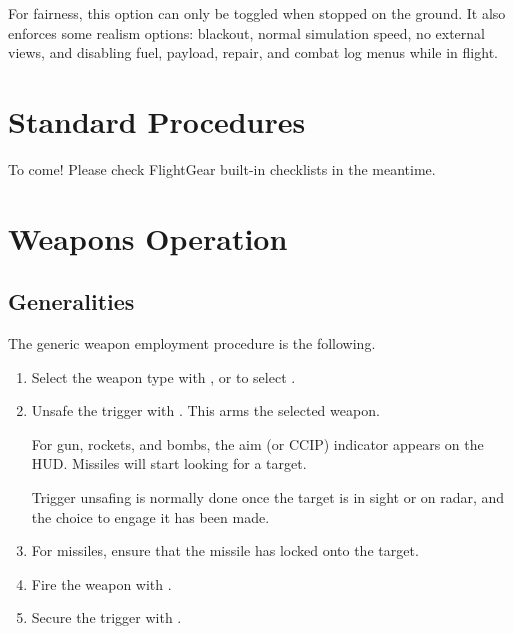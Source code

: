 \documentclass[a4paper]{report}
\begin{document}
\begin{description}
    For fairness, this option can only be toggled when stopped on the ground.
    It also enforces some realism options: blackout, normal simulation speed,
    no external views, and disabling fuel, payload, repair, and combat log menus while in flight.
\end{description}


\chapter{Standard Procedures}
To come! Please check FlightGear built-in checklists
 in the meantime.


\chapter{Weapons Operation}
\label{chap:weapons}
\section{Generalities}
The generic weapon employment procedure is the following.
\begin{enumerate}
    Combat mode will only be enabled in the air with gear up and locked.
    In combat mode, the HUD presentation changes slightly.
    Weapon type is indicated in the lower left, ammunition in the lower right.
  \item Select the weapon type with , or  to select
    .
  \item Unsafe the trigger with .
    This arms the selected weapon.

    For gun, rockets, and bombs, the aim (or CCIP) indicator appears on the HUD.
    Missiles will start looking for a target.

    Trigger unsafing is normally done once the target is in sight or on radar,
    and the choice to engage it has been made.
  \item For missiles, ensure that the missile has locked onto the target.
  \item Fire the weapon with .
  \item Secure the trigger with .
\end{enumerate}
\end{document}
